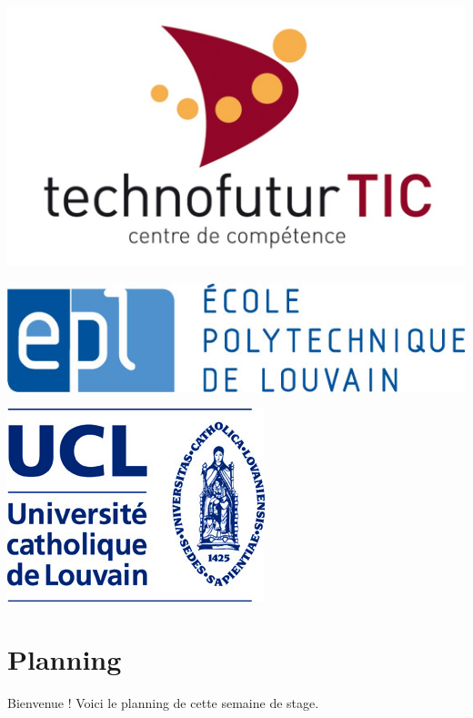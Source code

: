 \documentclass[12t,a4paper]{article}
\begin{document}
\begin{minipage}{0.3\linewidth}
\includegraphics[scale=0.25]{tic_logo.jpg}
\end{minipage}
\hfill
\begin{minipage}{0.3\linewidth}
\includegraphics[scale=0.25]{epl-logo.jpg}
\end{minipage}
\hfill
\begin{minipage}{0.3\linewidth}
\includegraphics[scale=0.25]{ucl-logo.jpg}
\end{minipage}

\thispagestyle{empty}
\setcounter{page}{0}
\newpage

\tableofcontents
\clearpage

\section{Planning}

Bienvenue ! Voici le planning de cette semaine de stage.
\end{document}
